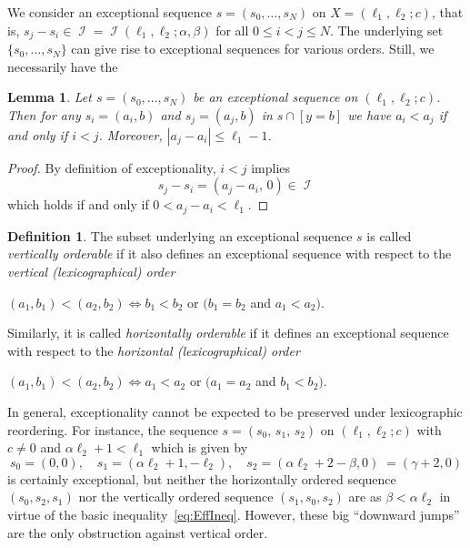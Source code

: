 \documentclass[11pt]{article}
\newtheorem{lemma}[theo]{Lemma}
\theoremstyle{definition}
\newtheorem{defi}[theo]{Definition}
\numberwithin{equation}{section}
\newcommand{\CI}{{\mathcal I}}
\newcommand{\nImm}{\operatorname{\CI}}
\newcommand{\xa}{\alpha}
\newcommand{\xb}{\beta}
\newcommand{\xc}{{\gamma}}
\newcommand{\gammaText}[1]{{#1}}
\newcommand{\cl}{s}
\begin{document}
We consider an exceptional sequence 
$\cl=(\cl_0,\ldots,\cl_N)$ on 
$X=(\ell_1,\ell_2;c)$, that is, 
$\cl_j-\cl_i\in\nImm=
\nImm(\ell_1,\ell_2;\xa,\xb)$ 
for all $0\leq i<j\leq N$. The 
underlying set $\{\cl_0,\ldots,\cl_N\}$ 
can give rise to exceptional 
sequences for various orders.
Still, we necessarily have the

\begin{lemma}
\label{lem:HorOrd}
Let $\cl=(\cl_0,\ldots,\cl_N)$ 
be an exceptional sequence on 
$(\ell_1,\ell_2;c)$. Then for 
any $\cl_i=(a_i,b)$ and $\cl_j=(a_j,b)$ 
in $\cl\cap[y=b]$ we have $a_i<a_j$ 
if and only if $i<j$. Moreover, 
$|a_j-a_i|\leq\ell_1-1$.
\end{lemma}

\begin{proof}
By definition of exceptionality, 
$i<j$ implies
$$
\cl_j-\cl_i=(a_j-a_i,\,0)\in\nImm
$$
which holds if and only if 
$0<a_j-a_i<\ell_1$. 
\end{proof}

\begin{defi}
The subset  
underlying an exceptional sequence 
$\cl$ is called {\em vertically orderable} 
if it also defines an exceptional 
sequence with respect to the {\em vertical 
(lexicographical) order} 
\begin{center}
$(a_1,b_1)<(a_2,b_2) \Leftrightarrow b_1<b_2$ or $\big(b_1=b_2$ and $a_1<a_2\big)$.
\end{center}
Similarly, it is called {\em horizontally 
orderable} if it defines an exceptional 
sequence with respect to the 
{\em horizontal (lexicographical) order}
\begin{center}
$(a_1,b_1)<(a_2,b_2) \Leftrightarrow a_1<a_2$ or $\big(a_1=a_2$ and 
$b_1<b_2\big)$.
\end{center}
\end{defi}

In general, exceptionality cannot 
be expected to be preserved under 
lexicographic reordering. For 
instance, the sequence 
$\cl=(\cl_0,\,\cl_1,\,\cl_2)$ on 
$(\ell_1,\ell_2;c)$ with $c\not=0$ 
and $\xa\ell_2+1<\ell_1$ 
which is given by
$$
\cl_0=(0,0),\quad\cl_1=(\xa\ell_2+1,
-\ell_2),
\quad\cl_2= (\xa\ell_2+2-\xb,0)
\gammaText{\;=(\xc+2,0)}
$$ 
is certainly exceptional, but 
neither the horizontally ordered 
sequence $(\cl_0,\cl_2,\cl_1)$ nor 
the vertically ordered sequence 
$(\cl_1,\cl_0,\cl_2)$ are as
$\xb<\xa\ell_2$ in virtue of the
basic inequality~\eqref{eq:EffIneq}. 
However, these big ``downward jumps'' are 
the only obstruction against vertical 
order. 
\end{document}
